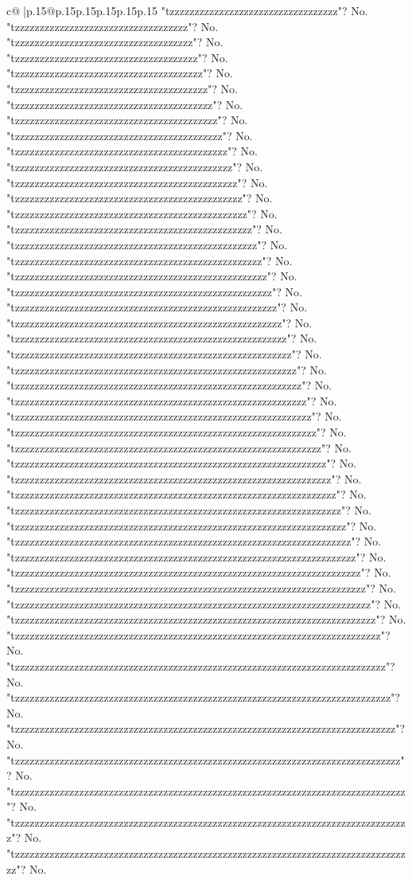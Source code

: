 \documentclass{article}
\begin{document}
{\begin{supertabular}{c@{$\;$}|p{.15\linewidth}@{}p{.15\linewidth}p{.15\linewidth}p{.15\linewidth}p{.15\linewidth}p{.15\linewidth}}
{{{"tzzzzzzzzzzzzzzzzzzzzzzzzzzzzzzzzzz"? No. "tzzzzzzzzzzzzzzzzzzzzzzzzzzzzzzzzzzz"? No. "tzzzzzzzzzzzzzzzzzzzzzzzzzzzzzzzzzzzz"? No. "tzzzzzzzzzzzzzzzzzzzzzzzzzzzzzzzzzzzzz"? No. "tzzzzzzzzzzzzzzzzzzzzzzzzzzzzzzzzzzzzzz"? No. "tzzzzzzzzzzzzzzzzzzzzzzzzzzzzzzzzzzzzzzz"? No. "tzzzzzzzzzzzzzzzzzzzzzzzzzzzzzzzzzzzzzzzz"? No. "tzzzzzzzzzzzzzzzzzzzzzzzzzzzzzzzzzzzzzzzzz"? No. "tzzzzzzzzzzzzzzzzzzzzzzzzzzzzzzzzzzzzzzzzzz"? No. "tzzzzzzzzzzzzzzzzzzzzzzzzzzzzzzzzzzzzzzzzzzz"? No. "tzzzzzzzzzzzzzzzzzzzzzzzzzzzzzzzzzzzzzzzzzzzz"? No. "tzzzzzzzzzzzzzzzzzzzzzzzzzzzzzzzzzzzzzzzzzzzzz"? No. "tzzzzzzzzzzzzzzzzzzzzzzzzzzzzzzzzzzzzzzzzzzzzzz"? No. "tzzzzzzzzzzzzzzzzzzzzzzzzzzzzzzzzzzzzzzzzzzzzzzz"? No. "tzzzzzzzzzzzzzzzzzzzzzzzzzzzzzzzzzzzzzzzzzzzzzzzz"? No. "tzzzzzzzzzzzzzzzzzzzzzzzzzzzzzzzzzzzzzzzzzzzzzzzzz"? No. "tzzzzzzzzzzzzzzzzzzzzzzzzzzzzzzzzzzzzzzzzzzzzzzzzzz"? No. "tzzzzzzzzzzzzzzzzzzzzzzzzzzzzzzzzzzzzzzzzzzzzzzzzzzz"? No. "tzzzzzzzzzzzzzzzzzzzzzzzzzzzzzzzzzzzzzzzzzzzzzzzzzzzz"? No. "tzzzzzzzzzzzzzzzzzzzzzzzzzzzzzzzzzzzzzzzzzzzzzzzzzzzzz"? No. "tzzzzzzzzzzzzzzzzzzzzzzzzzzzzzzzzzzzzzzzzzzzzzzzzzzzzzz"? No. "tzzzzzzzzzzzzzzzzzzzzzzzzzzzzzzzzzzzzzzzzzzzzzzzzzzzzzzz"? No. "tzzzzzzzzzzzzzzzzzzzzzzzzzzzzzzzzzzzzzzzzzzzzzzzzzzzzzzzz"? No. "tzzzzzzzzzzzzzzzzzzzzzzzzzzzzzzzzzzzzzzzzzzzzzzzzzzzzzzzzz"? No. "tzzzzzzzzzzzzzzzzzzzzzzzzzzzzzzzzzzzzzzzzzzzzzzzzzzzzzzzzzz"? No. "tzzzzzzzzzzzzzzzzzzzzzzzzzzzzzzzzzzzzzzzzzzzzzzzzzzzzzzzzzzz"? No. "tzzzzzzzzzzzzzzzzzzzzzzzzzzzzzzzzzzzzzzzzzzzzzzzzzzzzzzzzzzzz"? No. "tzzzzzzzzzzzzzzzzzzzzzzzzzzzzzzzzzzzzzzzzzzzzzzzzzzzzzzzzzzzzz"? No. "tzzzzzzzzzzzzzzzzzzzzzzzzzzzzzzzzzzzzzzzzzzzzzzzzzzzzzzzzzzzzzz"? No. "tzzzzzzzzzzzzzzzzzzzzzzzzzzzzzzzzzzzzzzzzzzzzzzzzzzzzzzzzzzzzzzz"? No. "tzzzzzzzzzzzzzzzzzzzzzzzzzzzzzzzzzzzzzzzzzzzzzzzzzzzzzzzzzzzzzzzz"? No. "tzzzzzzzzzzzzzzzzzzzzzzzzzzzzzzzzzzzzzzzzzzzzzzzzzzzzzzzzzzzzzzzzz"? No. "tzzzzzzzzzzzzzzzzzzzzzzzzzzzzzzzzzzzzzzzzzzzzzzzzzzzzzzzzzzzzzzzzzz"? No. "tzzzzzzzzzzzzzzzzzzzzzzzzzzzzzzzzzzzzzzzzzzzzzzzzzzzzzzzzzzzzzzzzzzz"? No. "tzzzzzzzzzzzzzzzzzzzzzzzzzzzzzzzzzzzzzzzzzzzzzzzzzzzzzzzzzzzzzzzzzzzz"? No. "tzzzzzzzzzzzzzzzzzzzzzzzzzzzzzzzzzzzzzzzzzzzzzzzzzzzzzzzzzzzzzzzzzzzzz"? No. "tzzzzzzzzzzzzzzzzzzzzzzzzzzzzzzzzzzzzzzzzzzzzzzzzzzzzzzzzzzzzzzzzzzzzzz"? No. "tzzzzzzzzzzzzzzzzzzzzzzzzzzzzzzzzzzzzzzzzzzzzzzzzzzzzzzzzzzzzzzzzzzzzzzz"? No. "tzzzzzzzzzzzzzzzzzzzzzzzzzzzzzzzzzzzzzzzzzzzzzzzzzzzzzzzzzzzzzzzzzzzzzzzz"? No. "tzzzzzzzzzzzzzzzzzzzzzzzzzzzzzzzzzzzzzzzzzzzzzzzzzzzzzzzzzzzzzzzzzzzzzzzzz"? No. "tzzzzzzzzzzzzzzzzzzzzzzzzzzzzzzzzzzzzzzzzzzzzzzzzzzzzzzzzzzzzzzzzzzzzzzzzzz"? No. "tzzzzzzzzzzzzzzzzzzzzzzzzzzzzzzzzzzzzzzzzzzzzzzzzzzzzzzzzzzzzzzzzzzzzzzzzzzz"? No. "tzzzzzzzzzzzzzzzzzzzzzzzzzzzzzzzzzzzzzzzzzzzzzzzzzzzzzzzzzzzzzzzzzzzzzzzzzzzz"? No. "tzzzzzzzzzzzzzzzzzzzzzzzzzzzzzzzzzzzzzzzzzzzzzzzzzzzzzzzzzzzzzzzzzzzzzzzzzzzzz"? No. "tzzzzzzzzzzzzzzzzzzzzzzzzzzzzzzzzzzzzzzzzzzzzzzzzzzzzzzzzzzzzzzzzzzzzzzzzzzzzzz"? No. "tzzzzzzzzzzzzzzzzzzzzzzzzzzzzzzzzzzzzzzzzzzzzzzzzzzzzzzzzzzzzzzzzzzzzzzzzzzzzzzz"? No. "tzzzzzzzzzzzzzzzzzzzzzzzzzzzzzzzzzzzzzzzzzzzzzzzzzzzzzzzzzzzzzzzzzzzzzzzzzzzzzzzz"? No. "tzzzzzzzzzzzzzzzzzzzzzzzzzzzzzzzzzzzzzzzzzzzzzzzzzzzzzzzzzzzzzzzzzzzzzzzzzzzzzzzzz"? No. }}}
\end{supertabular}}
\end{document}

